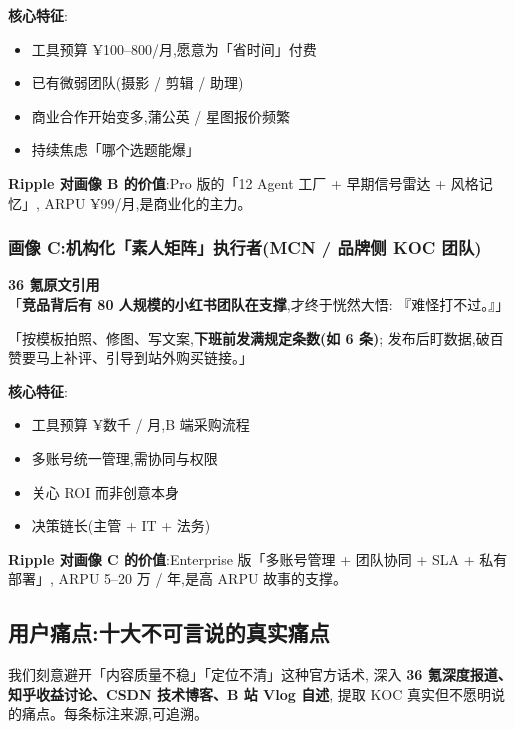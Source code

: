 \textbf{核心特征}:
\begin{itemize}
\item 工具预算 ¥100--800/月,愿意为「省时间」付费
\item 已有微弱团队(摄影 / 剪辑 / 助理)
\item 商业合作开始变多,蒲公英 / 星图报价频繁
\item 持续焦虑「哪个选题能爆」
\end{itemize}

\textbf{Ripple 对画像 B 的价值}:Pro 版的「12 Agent 工厂 + 早期信号雷达 + 风格记忆」,
ARPU ¥99/月,是商业化的主力。

\subsubsection{画像 C:机构化「素人矩阵」执行者(MCN / 品牌侧 KOC 团队)}

\begin{quote-box}
\textbf{36 氪原文引用}\\
「\textbf{竞品背后有 80 人规模的小红书团队在支撑},才终于恍然大悟:
『难怪打不过。』」

「按模板拍照、修图、写文案,\textbf{下班前发满规定条数(如 6 条)};
发布后盯数据,破百赞要马上补评、引导到站外购买链接。」
\end{quote-box}

\textbf{核心特征}:
\begin{itemize}
\item 工具预算 ¥数千 / 月,B 端采购流程
\item 多账号统一管理,需协同与权限
\item 关心 ROI 而非创意本身
\item 决策链长(主管 + IT + 法务)
\end{itemize}

\textbf{Ripple 对画像 C 的价值}:Enterprise 版「多账号管理 + 团队协同 + SLA + 私有部署」,
ARPU 5--20 万 / 年,是高 ARPU 故事的支撑。


\subsection{用户痛点:十大不可言说的真实痛点}

我们刻意避开「内容质量不稳」「定位不清」这种官方话术,
深入 \textbf{36 氪深度报道、知乎收益讨论、CSDN 技术博客、B 站 Vlog 自述},
提取 KOC 真实但不愿明说的痛点。每条标注来源,可追溯。

